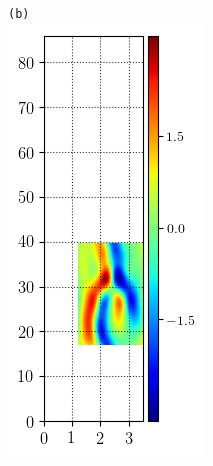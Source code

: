 \documentclass[mathserif, handout]{beamer}
\begin{document}
\begin{frame}
\begin{figure}
\begin{minipage}[height=.48\textheight]{.48\textwidth}
\centering \small{\texttt{(b)}}\\
\includegraphics[width=.8\textwidth,height=.4\textheight]{MNG_ppo_subdomain_HalfD}
\end{minipage}
\end{figure}
\end{frame}
\end{document}
